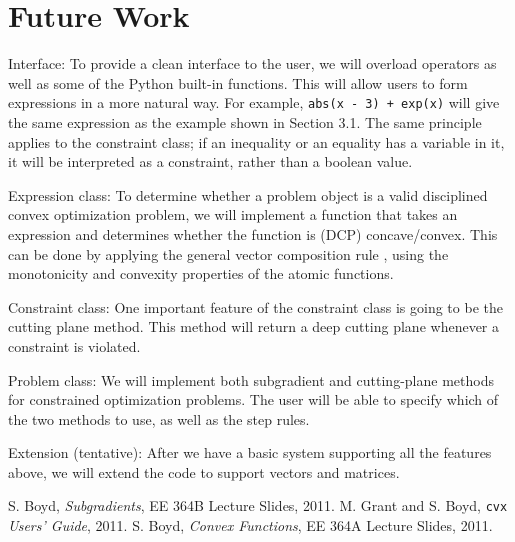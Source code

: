 \documentclass[12pt]{article}
\begin{document}
\section{Future Work}

\BIT
\item Interface: To provide a clean interface to the user, we will overload operators as well as some of the Python built-in functions. This will allow users to form expressions in a more natural way. For example, \verb'abs(x - 3) + exp(x)' will give the same expression as the example shown in Section 3.1. The same principle applies to the constraint class; if an inequality or an equality has a variable in it, it will be interpreted as a constraint, rather than a boolean value.
\item Expression class: To determine whether a problem object is a valid disciplined convex optimization problem, we will implement a function that takes an expression and determines whether the function is (DCP) concave/convex. This can be done by applying the general vector composition rule \cite{cvx}, using the monotonicity and convexity properties of the atomic functions.
\item Constraint class: One important feature of the constraint class is going to be the cutting plane method. This method will return a deep cutting plane whenever a constraint is violated.
\item Problem class: We will implement both subgradient and cutting-plane methods for constrained optimization problems. The user will be able to specify which of the two methods to use, as well as the step rules.
\item Extension (tentative): After we have a basic system supporting all the features above, we will extend the code to support vectors and matrices.
\EIT

\begin{thebibliography}{99}
 S. Boyd, \emph{Subgradients}, EE 364B Lecture Slides, 2011.
 M. Grant and S. Boyd, \verb'cvx' \emph{Users' Guide}, 2011.
 S. Boyd, \emph{Convex Functions}, EE 364A Lecture Slides, 2011.
\end{thebibliography}
\end{document}
